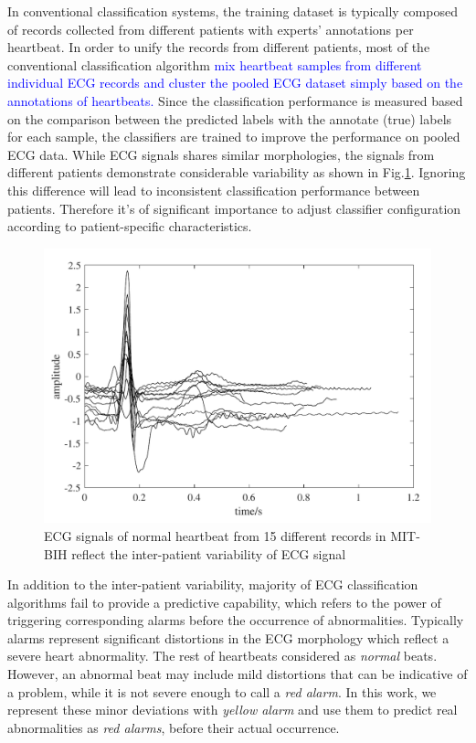 In conventional classification systems, the training dataset is typically composed of records collected from different patients with experts' annotations per heartbeat. In order to unify the records from different patients, most of the conventional classification algorithm \textcolor{blue}{mix heartbeat samples from different individual ECG records and cluster the pooled ECG dataset simply based on the annotations of heartbeats.} %
Since the classification performance is measured based on the comparison between the predicted labels with the annotate (true) labels for each sample, the classifiers are trained to improve the performance on pooled ECG data. While ECG signals shares similar morphologies, the signals from different patients demonstrate considerable variability as shown in Fig.\ref{fig:interpatient_variability}. Ignoring this difference will lead to inconsistent classification performance between patients. Therefore it's of significant importance to adjust classifier configuration according to patient-specific characteristics.  %

 \begin{figure}[thpb]
 	\centering
 	\includegraphics[scale=0.7]{Fig/interpatient_variability.pdf}
 	\caption{ECG signals of normal heartbeat from 15 different records in MIT-BIH reflect the inter-patient variability of ECG signal}
 	\label{fig:interpatient_variability}
 \end{figure}

In addition to the inter-patient variability, majority of ECG classification algorithms fail to provide a predictive capability, which refers to the power of triggering corresponding alarms before the occurrence of abnormalities. Typically alarms represent significant distortions in the ECG morphology which reflect a severe heart abnormality. The rest of heartbeats considered as \textit{normal} beats. However, an abnormal beat may include mild distortions that can be indicative of a problem, while it is not severe enough to call a \textit{red alarm}. In this work, we represent these minor deviations with \textit{yellow alarm} and use them to predict real abnormalities as \textit{red alarms}, before their actual occurrence.

